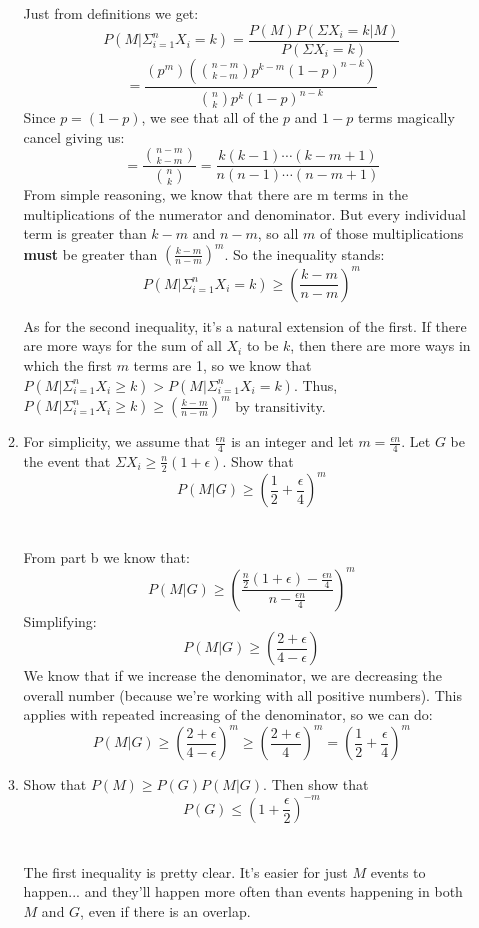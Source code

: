 \begin{enumerate}
\begin{enumerate}
        Just from definitions we get:
        $$P(M | \Sigma_{i=1}^n X_i = k) = \frac{P(M)P(\Sigma X_i = k | M)}{P(\Sigma X_i = k)}$$
        $$=\frac{(p^m)(\binom{n-m}{k-m}p^{k-m}(1-p)^{n-k})}{\binom{n}{k} p^k (1-p)^{n-k}}$$
        Since $p = (1-p)$, we see that all of the $p$ and $1-p$ terms magically cancel giving us:
        $$=\frac{\binom{n-m}{k-m}}{\binom{n}{k}} = \frac{k(k-1)\cdots(k-m+1)}{n(n-1) \cdots (n-m+1)}$$
        From simple reasoning, we know that there are m terms in the multiplications of the numerator and denominator. But every individual term is greater than $k-m$ and $n-m$, so all $m$ of those multiplications \textbf{must} be greater than $(\frac{k-m}{n-m})^m$. So the inequality stands:
        $$P(M | \Sigma_{i=1}^n X_i = k) \geq (\frac{k-m}{n-m})^m$$

        As for the second inequality, it's a natural extension of the first. If there are more ways for the sum of all $X_i$ to be $k$, then there are more ways in which the first $m$ terms are 1, so we know that $P(M | \Sigma_{i=1}^n X_i \geq k) > P(M | \Sigma_{i=1}^n X_i = k)$. Thus, $P(M | \Sigma_{i=1}^n X_i \geq k) \geq (\frac{k-m}{n-m})^m$ by transitivity.\\

      \item For simplicity, we assume that $\frac{\epsilon n}{4}$ is an integer and let $m = \frac{\epsilon n}{4}$. Let $G$ be the event that $\Sigma X_i \geq \frac{n}{2}(1 + \epsilon)$. Show that
        $$P(M | G) \geq (\frac{1}{2} + \frac{\epsilon}{4})^m$$\\\\

        From part b we know that:
        $$P(M | G) \geq (\frac{\frac{n}{2}(1 + \epsilon) - \frac{\epsilon n}{4}}{n - \frac{\epsilon n}{4}})^m$$
        Simplifying:
        $$P(M | G) \geq (\frac{2 + \epsilon}{4 - \epsilon})$$
        We know that if we increase the denominator, we are decreasing the overall number (because we're working with all positive numbers). This applies with repeated increasing of the denominator, so we can do:
        $$P(M | G) \geq (\frac{2 + \epsilon}{4 - \epsilon})^m \geq (\frac{2 + \epsilon}{4})^m = (\frac{1}{2} + \frac{\epsilon}{4})^m$$

      \item Show that $P(M) \geq P(G)P(M|G)$. Then show that 
        $$P(G) \leq (1 + \frac{\epsilon}{2})^{-m}$$\\\\

        The first inequality is pretty clear. It's easier for just $M$ events to happen... and they'll happen more often than events happening in both $M$ and $G$, even if there is an overlap.\\


\end{enumerate}
\end{enumerate}
